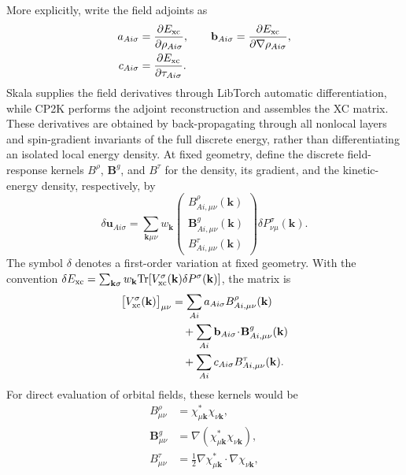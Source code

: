 \documentclass[10pt,a4paper,twocolumn]{article}
\newcommand{\uvec}{\boldsymbol{u}}
\begin{document}
More explicitly, write the field adjoints as
\begin{equation}
 \begin{aligned}
 a_{Ai\sigma}&=\frac{\partial E_{\rm xc}}{\partial\rho_{Ai\sigma}},\qquad
 \mathbf b_{Ai\sigma}=\frac{\partial E_{\rm xc}}{\partial\nabla\rho_{Ai\sigma}},\\
 c_{Ai\sigma}&=\frac{\partial E_{\rm xc}}{\partial\tau_{Ai\sigma}}.
 \end{aligned}
 \label{eq:field-adjoints}
\end{equation}
Skala supplies the field derivatives through LibTorch automatic differentiation, while CP2K performs the adjoint reconstruction and assembles the XC matrix. These derivatives are obtained by back-propagating through all nonlocal layers and spin-gradient invariants of the full discrete energy, rather than differentiating an isolated local energy density. At fixed geometry, define the discrete field-response kernels $B^\rho$, $\mathbf B^g$, and $B^\tau$ for the density, its gradient, and the kinetic-energy density, respectively, by
\begin{equation}
 \delta\uvec_{Ai\sigma}=\sum_{\mathbf k\mu\nu}w_{\mathbf k}
 \begin{pmatrix}B^\rho_{Ai,\mu\nu}(\mathbf k)\\
 \mathbf B^g_{Ai,\mu\nu}(\mathbf k)\\B^\tau_{Ai,\mu\nu}(\mathbf k)\end{pmatrix}
 \delta P^\sigma_{\nu\mu}(\mathbf k).
 \label{eq:field-response}
\end{equation}
The symbol $\delta$ denotes a first-order variation at fixed geometry. With the convention $\delta E_{\rm xc}=\sum_{\mathbf k\sigma}w_{\mathbf k}
\mathrm{Tr}[V^\sigma_{\rm xc}(\mathbf k)\delta P^\sigma(\mathbf k)]$, the matrix is
\begin{equation}
 \begin{aligned}
 \bigl[V^\sigma_{\rm xc}(\mathbf k)\bigr]_{\mu\nu}
 &=\sum_{Ai}a_{Ai\sigma}B^\rho_{Ai,\mu\nu}(\mathbf k)\\
 &\quad+\sum_{Ai}\mathbf b_{Ai\sigma}\!\cdot\!\mathbf B^g_{Ai,\mu\nu}(\mathbf k)\\
 &\quad+\sum_{Ai}c_{Ai\sigma}B^\tau_{Ai,\mu\nu}(\mathbf k).
 \end{aligned}
 \label{eq:explicit-xc-matrix}
\end{equation}
For direct evaluation of orbital fields, these kernels would be
\begin{equation}
 \begin{aligned}
 B^\rho_{\mu\nu}&=\chi_{\mu\mathbf k}^*\chi_{\nu\mathbf k},\\
 \mathbf B^g_{\mu\nu}&=\nabla(\chi_{\mu\mathbf k}^*\chi_{\nu\mathbf k}),\\
 B^\tau_{\mu\nu}&=\tfrac12\nabla\chi_{\mu\mathbf k}^*\!\cdot\!\nabla\chi_{\nu\mathbf k},
 \end{aligned}
 \label{eq:orbital-field-kernels}
\end{equation}
\end{document}
